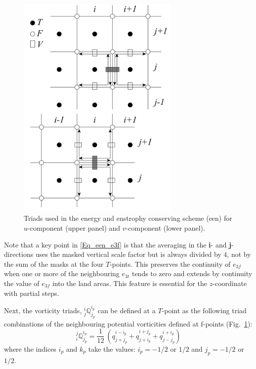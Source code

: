 \begin{figure}[!ht]    \begin{center}
\includegraphics[width=0.70\textwidth]{./TexFiles/Figures/Fig_DYN_een_triad.pdf}
\caption{ \label{Fig_DYN_een_triad}  
Triads used in the energy and enstrophy conserving scheme (een) for 
$u$-component (upper panel) and $v$-component (lower panel).}
\end{center}   \end{figure}

Note that a key point in \eqref{Eq_een_e3f} is that the averaging in the \textbf{i}- and 
\textbf{j}- directions uses the masked vertical scale factor but is always divided by 
$4$, not by the sum of the masks at the four $T$-points. This preserves the continuity of 
$e_{3f}$ when one or more of the neighbouring $e_{3t}$ tends to zero and 
extends by continuity the value of $e_{3f}$ into the land areas. This feature is essential for 
the $z$-coordinate with partial steps.

Next, the vorticity triads, $ {^i_j}\mathbb{Q}^{i_p}_{j_p}$ can be defined at a $T$-point as 
the following triad combinations of the neighbouring potential vorticities defined at f-points 
(Fig.~\ref{Fig_DYN_een_triad}): 
\begin{equation} \label{Q_triads}
_i^j \mathbb{Q}^{i_p}_{j_p}
= \frac{1}{12} \ \left(   q^{i-i_p}_{j+j_p} + q^{i+j_p}_{j+i_p} + q^{i+i_p}_{j-j_p}  \right)
\end{equation}
where the indices $i_p$ and $k_p$ take the values: $i_p = -1/2$ or $1/2$ and $j_p = -1/2$ or $1/2$. 

